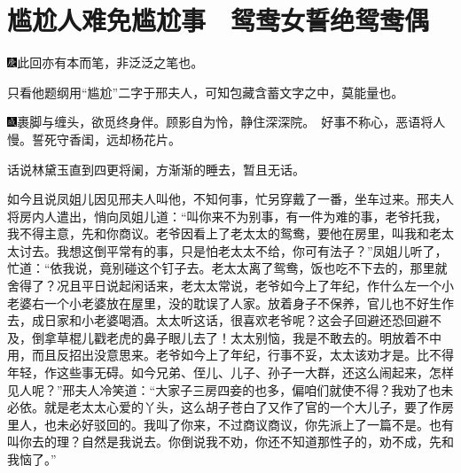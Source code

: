 

\chapter{尴尬人难免尴尬事　鸳鸯女誓绝鸳鸯偶}\label{part0050_split_000.htmlux5cux23calibre_pb_0}

{\includegraphics[width=3mm]{../Images/00004}此回亦有本而笔，非泛泛之笔也。}

{只看他题纲用``尴尬''二字于邢夫人，可知包藏含蓄文字之中，莫能量也。}

{\includegraphics[width=3mm]{../Images/00005}裹脚与缠头，欲觅终身伴。顾影自为怜，静住深深院。　好事不称心，恶语将人慢。誓死守香闺，远却杨花片。}

话说林黛玉直到四更将阑，方渐渐的睡去，暂且无话。

如今且说凤姐儿因见邢夫人叫他，不知何事，忙另穿戴了一番，坐车过来。邢夫人将房内人遣出，悄向凤姐儿道：``叫你来不为别事，有一件为难的事，老爷托我，我不得主意，先和你商议。老爷因看上了老太太的鸳鸯，要他在房里，叫我和老太太讨去。我想这倒平常有的事，只是怕老太太不给，你可有法子？''凤姐儿听了，忙道：``依我说，竟别碰这个钉子去。老太太离了鸳鸯，饭也吃不下去的，那里就舍得了？况且平日说起闲话来，老太太常说，老爷如今上了年纪，作什么左一个小老婆右一个小老婆放在屋里，没的耽误了人家。放着身子不保养，官儿也不好生作去，成日家和小老婆喝酒。太太听这话，很喜欢老爷呢？这会子回避还恐回避不及，倒拿草棍儿戳老虎的鼻子眼儿去了！太太别恼，我是不敢去的。明放着不中用，而且反招出没意思来。老爷如今上了年纪，行事不妥，太太该劝才是。比不得年轻，作这些事无碍。如今兄弟、侄儿、儿子、孙子一大群，还这么闹起来，怎样见人呢？''邢夫人冷笑道：``大家子三房四妾的也多，偏咱们就使不得？我劝了也未必依。就是老太太心爱的丫头，这么胡子苍白了又作了官的一个大儿子，要了作房里人，也未必好驳回的。我叫了你来，不过商议商议，你先派上了一篇不是。也有叫你去的理？自然是我说去。你倒说我不劝，你还不知道那性子的，劝不成，先和我恼了。''

